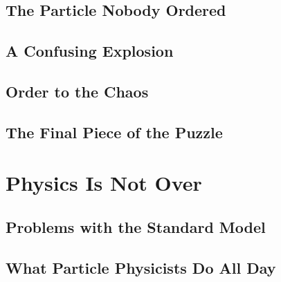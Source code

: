 \subsection{The Particle Nobody Ordered}

\subsection{A Confusing Explosion}

\subsection{Order to the Chaos}

\subsection{The Final Piece of the Puzzle}

\section{Physics Is Not Over}

\subsection{Problems with the Standard Model}

\subsection{What Particle Physicists Do All Day}